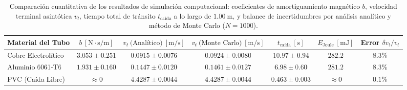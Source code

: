 \begin{table}[htbp]
\centering
\small
\setlength{\tabcolsep}{4.5pt}
\caption{Comparación cuantitativa de los resultados de simulación computacional: coeficientes de amortiguamiento magnético $b$, velocidad terminal asintótica $v_t$, tiempo total de tránsito $t_{\mathrm{caída}}$ a lo largo de $1.00\ \mathrm{m}$, y balance de incertidumbres por análisis analítico y método de Monte Carlo ($N=1000$).}
\label{tab:resultados}
\begin{ruledtabular}
\begin{tabular}{lcccccc}
\textbf{Material del Tubo} & $b\ [\mathrm{N\cdot s/m}]$ & $v_t\ \text{(Analítico)}\ [\mathrm{m/s}]$ & $v_t\ \text{(Monte Carlo)}\ [\mathrm{m/s}]$ & $t_{\mathrm{caída}}\ [\mathrm{s}]$ & $E_{\mathrm{Joule}}\ [\mathrm{mJ}]$ & Error $\delta v_t / v_t$ \\
\hline
Cobre Electrolítico & $3.053 \pm 0.251$ & $0.0915 \pm 0.0076$ & $0.0924 \pm 0.0080$ & $10.97 \pm 0.94$ & $282.2$ & $8.3\%$ \\
Aluminio 6061-T6 & $1.931 \pm 0.160$ & $0.1447 \pm 0.0120$ & $0.1461 \pm 0.0127$ & $6.98 \pm 0.60$ & $281.2$ & $8.3\%$ \\
PVC (Caída Libre) & $\approx 0$ & $4.4287 \pm 0.0044$ & $4.4287 \pm 0.0044$ & $0.463 \pm 0.003$ & $\approx 0$ & $0.1\%$ \\
\end{tabular}
\end{ruledtabular}
\end{table}

